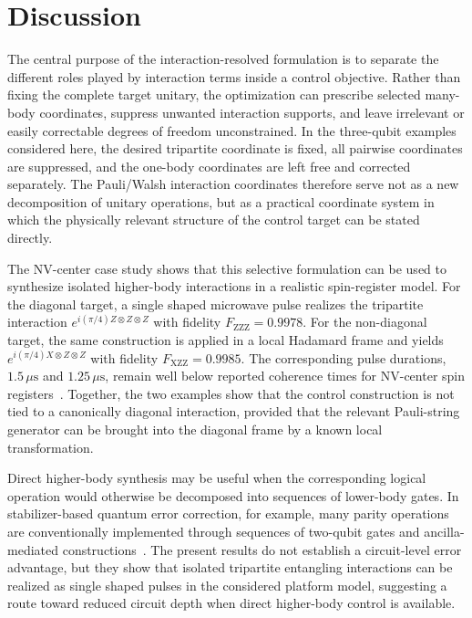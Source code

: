 \section{Discussion}
\label{sec:discussion}

\noindent
The central purpose of the interaction-resolved formulation is to separate the different roles played by interaction terms inside a control objective. Rather than fixing the complete target unitary, the optimization can prescribe selected many-body coordinates, suppress unwanted interaction supports, and leave irrelevant or easily correctable degrees of freedom unconstrained. In the three-qubit examples considered here, the desired tripartite coordinate is fixed, all pairwise coordinates are suppressed, and the one-body coordinates are left free and corrected separately. The Pauli/Walsh interaction coordinates therefore serve not as a new decomposition of unitary operations, but as a practical coordinate system in which the physically relevant structure of the control target can be stated directly.

\noindent
The NV-center case study shows that this selective formulation can be used to synthesize isolated higher-body interactions in a realistic spin-register model. For the diagonal target, a single shaped microwave pulse realizes the tripartite interaction $e^{i(\pi/4)Z\otimes Z\otimes Z}$ with fidelity $F_{\mathrm{ZZZ}}=0.9978$. For the non-diagonal target, the same construction is applied in a local Hadamard frame and yields $e^{i(\pi/4)X\otimes Z\otimes Z}$ with fidelity $F_{\mathrm{XZZ}}=0.9985$. The corresponding pulse durations, $1.5\,\mu\mathrm{s}$ and $1.25\,\mu\mathrm{s}$, remain well below reported coherence times for NV-center spin registers~\cite{hanson2008coherent,naydenov2011dynamical,balasubramanian2009ultralong,maurer2012room,childress2006coherent,taminiau2014universal}. Together, the two examples show that the control construction is not tied to a canonically diagonal interaction, provided that the relevant Pauli-string generator can be brought into the diagonal frame by a known local transformation.

\noindent
Direct higher-body synthesis may be useful when the corresponding logical operation would otherwise be decomposed into sequences of lower-body gates. In stabilizer-based quantum error correction, for example, many parity operations are conventionally implemented through sequences of two-qubit gates and ancilla-mediated constructions~\cite{gottesman1997stabilizer,fowler2012surface,litinski2019game,taminiau2014universal}. The present results do not establish a circuit-level error advantage, but they show that isolated tripartite entangling interactions can be realized as single shaped pulses in the considered platform model, suggesting a route toward reduced circuit depth when direct higher-body control is available.

